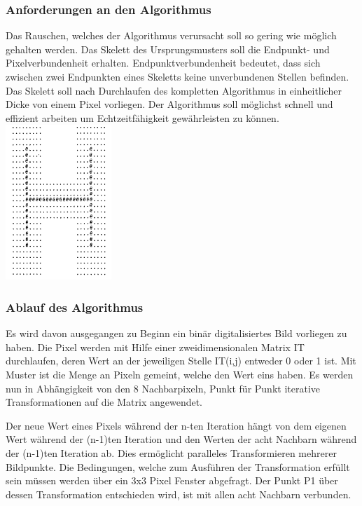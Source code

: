 \documentclass[
	12pt,
	a4paper,
	BCOR10mm,
	DIV14,
	listof=totoc,
	bibliography=totoc,
	headsepline
]{scrreprt}
\begin{document}
\subsubsection{Anforderungen an den Algorithmus}

Das Rauschen, welches der Algorithmus verursacht soll so gering wie möglich gehalten werden.
Das Skelett des Ursprungsmusters soll die Endpunkt- und Pixelverbundenheit erhalten.
Endpunktverbundenheit bedeutet, dass sich zwischen zwei Endpunkten eines Skeletts keine unverbundenen Stellen befinden.
Das Skelett soll nach Durchlaufen des kompletten Algorithmus in einheitlicher Dicke von einem Pixel vorliegen.
Der Algorithmus soll möglichst schnell und effizient arbeiten um Echtzeitfähigkeit gewährleisten zu können.\\


\includegraphics[width=4cm]{Res/Skelett.png}

\subsubsection{Ablauf des Algorithmus}

Es wird davon ausgegangen zu Beginn ein binär digitalisiertes Bild vorliegen zu haben.
Die Pixel werden mit Hilfe einer zweidimensionalen Matrix IT durchlaufen, deren Wert an der jeweiligen Stelle IT(i,j) entweder 0 oder 1 ist.
Mit Muster ist die Menge an Pixeln gemeint, welche den Wert eins haben.
Es werden nun in Abhängigkeit von den 8 Nachbarpixeln, Punkt für Punkt iterative Transformationen auf die Matrix angewendet.

Der neue Wert eines Pixels während der n-ten Iteration hängt von dem eigenen Wert während der (n-1)ten Iteration und den Werten der acht Nachbarn während der (n-1)ten Iteration ab. Dies ermöglicht paralleles Transformieren mehrerer Bildpunkte. 
Die Bedingungen, welche zum Ausführen der Transformation erfüllt sein müssen werden über ein 3x3 Pixel Fenster abgefragt. Der Punkt P1 über dessen Transformation entschieden wird, ist mit allen acht Nachbarn verbunden.\\
\end{document}
